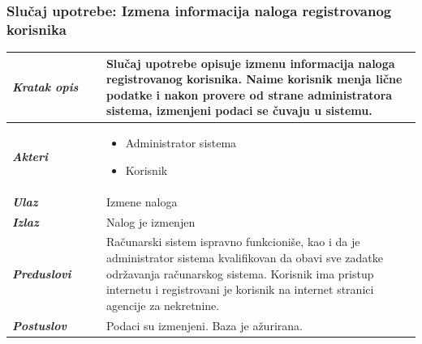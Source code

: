 \documentclass[20pt]{article}
\begin{document}
\subsubsection{\bfseries \large Slu\v{c}aj upotrebe: Izmena informacija naloga registrovanog korisnika}
\begin{center}
\begin{longtable}{p{0.23\linewidth} p{0.77\linewidth}}
\hline
 {\it \bfseries Kratak opis} &Slu\v {c}aj upotrebe opisuje izmenu informacija naloga registrovanog korisnika. Naime korisnik menja li\v {c}ne podatke i nakon provere od strane administratora sistema, izmenjeni podaci se \v {c}uvaju u sistemu.\\
 \hline
 {\it \bfseries Akteri} & \begin{itemize}
    \item Administrator sistema
    \item Korisnik
\end{itemize}\\
\hline

 {\it \bfseries Ulaz} & Izmene naloga\\
 \hline
 
 {\it \bfseries Izlaz} & Nalog je izmenjen\\
 \hline
 
 {\it \bfseries Preduslovi} & Ra\v {c}unarski sistem ispravno funkcioni\v {s}e, kao i da je administrator sistema kvalifikovan da obavi sve zadatke odr\v {z}avanja ra\v {c}unarskog sistema. Korisnik ima pristup internetu i registrovani je korisnik na internet stranici agencije za nekretnine.\\
 \hline
 
 {\it \bfseries Postuslov} & Podaci su izmenjeni. Baza je a\v {z}urirana.\\
 \hline


\end{longtable}
\end{center}
\end{document}
